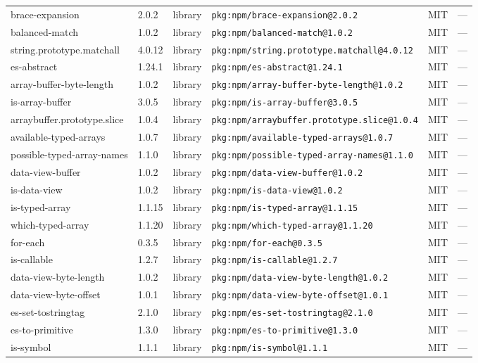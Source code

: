 \documentclass[11pt]{article}
\begin{document}
\begin{longtable}{|l|l|l|p{2.2cm}|l|p{4cm}|}
brace-expansion & 2.0.2 & library & \texttt{pkg:npm/brace-expansion@2.0.2} & MIT & — \\
balanced-match & 1.0.2 & library & \texttt{pkg:npm/balanced-match@1.0.2} & MIT & — \\
string.prototype.matchall & 4.0.12 & library & \texttt{pkg:npm/string.prototype.matchall@4.0.12} & MIT & — \\
es-abstract & 1.24.1 & library & \texttt{pkg:npm/es-abstract@1.24.1} & MIT & — \\
array-buffer-byte-length & 1.0.2 & library & \texttt{pkg:npm/array-buffer-byte-length@1.0.2} & MIT & — \\
is-array-buffer & 3.0.5 & library & \texttt{pkg:npm/is-array-buffer@3.0.5} & MIT & — \\
arraybuffer.prototype.slice & 1.0.4 & library & \texttt{pkg:npm/arraybuffer.prototype.slice@1.0.4} & MIT & — \\
available-typed-arrays & 1.0.7 & library & \texttt{pkg:npm/available-typed-arrays@1.0.7} & MIT & — \\
possible-typed-array-names & 1.1.0 & library & \texttt{pkg:npm/possible-typed-array-names@1.1.0} & MIT & — \\
data-view-buffer & 1.0.2 & library & \texttt{pkg:npm/data-view-buffer@1.0.2} & MIT & — \\
is-data-view & 1.0.2 & library & \texttt{pkg:npm/is-data-view@1.0.2} & MIT & — \\
is-typed-array & 1.1.15 & library & \texttt{pkg:npm/is-typed-array@1.1.15} & MIT & — \\
which-typed-array & 1.1.20 & library & \texttt{pkg:npm/which-typed-array@1.1.20} & MIT & — \\
for-each & 0.3.5 & library & \texttt{pkg:npm/for-each@0.3.5} & MIT & — \\
is-callable & 1.2.7 & library & \texttt{pkg:npm/is-callable@1.2.7} & MIT & — \\
data-view-byte-length & 1.0.2 & library & \texttt{pkg:npm/data-view-byte-length@1.0.2} & MIT & — \\
data-view-byte-offset & 1.0.1 & library & \texttt{pkg:npm/data-view-byte-offset@1.0.1} & MIT & — \\
es-set-tostringtag & 2.1.0 & library & \texttt{pkg:npm/es-set-tostringtag@2.1.0} & MIT & — \\
es-to-primitive & 1.3.0 & library & \texttt{pkg:npm/es-to-primitive@1.3.0} & MIT & — \\
is-symbol & 1.1.1 & library & \texttt{pkg:npm/is-symbol@1.1.1} & MIT & — \\

\end{longtable}
\end{document}
